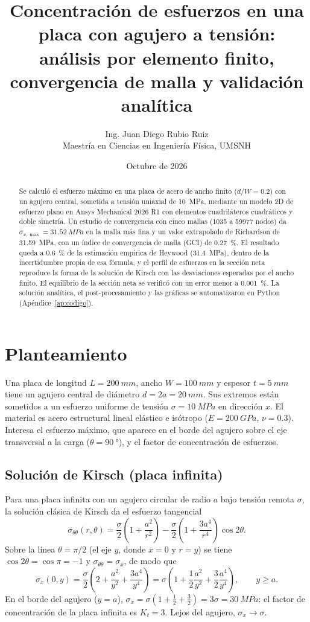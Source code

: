 \documentclass[11pt,letterpaper]{article}
\title{\textbf{Concentración de esfuerzos en una placa con agujero a tensión:\\ análisis por elemento finito, convergencia de malla y validación analítica}}
\author{Ing. Juan Diego Rubio Ruiz\\\small Maestría en Ciencias en Ingeniería Física, UMSNH}
\date{Octubre de 2026}
\begin{document}
\maketitle
\begin{abstract}
Se calculó el esfuerzo máximo en una placa de acero de ancho finito ($d/W=0.2$) con un agujero central, sometida a tensión uniaxial de \SI{10}{MPa}, mediante un modelo 2D de esfuerzo plano en Ansys Mechanical 2026 R1 con elementos cuadriláteros cuadráticos y doble simetría. Un estudio de convergencia con cinco mallas (\num{1035} a \num{59977} nodos) da $\sigma_{x,\max}=\SI{31.52}{MPa}$ en la malla más fina y un valor extrapolado de Richardson de \SI{31.59}{MPa}, con un índice de convergencia de malla (GCI) de \SI{0.27}{\%}. El resultado queda a \SI{0.6}{\%} de la estimación empírica de Heywood (\SI{31.4}{MPa}), dentro de la incertidumbre propia de esa fórmula, y el perfil de esfuerzos en la sección neta reproduce la forma de la solución de Kirsch con las desviaciones esperadas por el ancho finito. El equilibrio de la sección neta se verificó con un error menor a \SI{0.001}{\%}. La solución analítica, el post-procesamiento y las gráficas se automatizaron en Python (Apéndice~\ref{ap:codigo}).
\end{abstract}

\section{Planteamiento}
Una placa de longitud $L=\SI{200}{mm}$, ancho $W=\SI{100}{mm}$ y espesor $t=\SI{5}{mm}$ tiene un agujero central de diámetro $d=2a=\SI{20}{mm}$. Sus extremos están sometidos a un esfuerzo uniforme de tensión $\sigma=\SI{10}{MPa}$ en dirección $x$. El material es acero estructural lineal elástico e isótropo ($E=\SI{200}{GPa}$, $\nu=0.3$). Interesa el esfuerzo máximo, que aparece en el borde del agujero sobre el eje transversal a la carga ($\theta=\SI{90}{\degree}$), y el factor de concentración de esfuerzos.

\subsection{Solución de Kirsch (placa infinita)}
Para una placa infinita con un agujero circular de radio $a$ bajo tensión remota $\sigma$, la solución clásica de Kirsch da el esfuerzo tangencial
\begin{equation}
\sigma_{\theta\theta}(r,\theta)=\frac{\sigma}{2}\left(1+\frac{a^2}{r^2}\right)-\frac{\sigma}{2}\left(1+\frac{3a^4}{r^4}\right)\cos 2\theta .
\end{equation}
Sobre la línea $\theta=\pi/2$ (el eje $y$, donde $x=0$ y $r=y$) se tiene $\cos 2\theta=\cos\pi=-1$ y $\sigma_{\theta\theta}=\sigma_x$, de modo que
\begin{equation}
\sigma_x(0,y)=\frac{\sigma}{2}\left(2+\frac{a^2}{y^2}+\frac{3a^4}{y^4}\right)=\sigma\left(1+\frac{1}{2}\frac{a^2}{y^2}+\frac{3}{2}\frac{a^4}{y^4}\right),\qquad y\ge a .
\label{eq:kirsch}
\end{equation}
En el borde del agujero ($y=a$), $\sigma_x=\sigma(1+\tfrac12+\tfrac32)=3\sigma=\SI{30}{MPa}$: el factor de concentración de la placa infinita es $K_t=3$. Lejos del agujero, $\sigma_x\to\sigma$.
\end{document}
